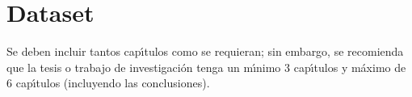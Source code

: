 \chapter{Dataset}
Se deben incluir tantos cap\'{\i}tulos como se requieran; sin embargo, se recomienda que la tesis  o trabajo de investigaci\'{o}n tenga un m\'{\i}nimo 3 cap\'{\i}tulos y m\'{a}ximo de 6 cap\'{\i}tulos (incluyendo las conclusiones).\\







